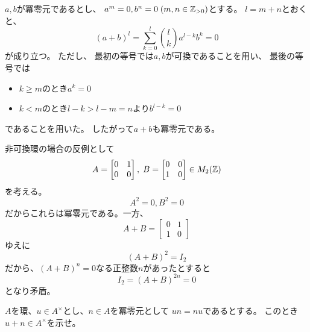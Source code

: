 \documentclass[report]{jlreq}
\begin{document}
\begin{answer}
    $a, b$が冪零元であるとし、
    $a^m = 0, b^n = 0\; (m, n \in \mathbb{Z}_{>0})$とする。
    $l = m + n$とおくと、
    \begin{equation}
        (a + b)^l = \sum_{k = 0}^l \binom{l}{k} a^{l - k} b^k
            = 0
    \end{equation}
    が成り立つ。
    ただし、
    最初の等号では$a, b$が可換であることを用い、
    最後の等号では
    \begin{itemize}
        \item $k \ge m$のとき$a^k = 0$
        \item $k < m$のとき$l - k > l - m = n$より$b^{l - k} = 0$
    \end{itemize}
    であることを用いた。
    したがって$a + b$も冪零元である。

    非可換環の場合の反例として
    \begin{equation}
        A = \begin{bmatrix}
            0 & 1 \\
            0 & 0
        \end{bmatrix},\;
        B = \begin{bmatrix}
            0 & 0 \\
            1 & 0
        \end{bmatrix}
        \in M_2(\mathbb{Z})
    \end{equation}
    を考える。
    \begin{equation}
        A^2 = 0, B^2 = 0
    \end{equation}
    だからこれらは冪零元である。一方、
    \begin{equation}
        A + B = \begin{bmatrix}
            0 & 1 \\
            1 & 0
        \end{bmatrix}
    \end{equation}
    ゆえに
    \begin{equation}
        (A + B)^2 = I_2
    \end{equation}
    だから、$(A + B)^n = 0$なる正整数$n$があったとすると
    \begin{equation}
        I_2
            = (A + B)^{2n}
            = 0
    \end{equation}
    となり矛盾。
\end{answer}


\begin{problem}[代数学II 1.5]
    $A$を環、$u \in A^\times$とし、$n \in A$を冪零元として
    $un = nu$であるとする。
    このとき$u + n \in A^\times$を示せ。
\end{problem}
\end{document}
